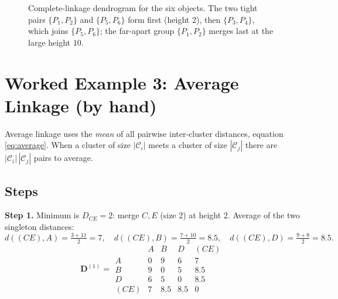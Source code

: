 \documentclass[11pt,a4paper]{report}
\theoremstyle{definition}
\theoremstyle{plain}
\theoremstyle{remark}
\newcommand{\C}{\mathcal{C}}
\newcommand{\merge}[5]{%
  \draw[thick] (#1,#2) -- (#1,#5) -- (#3,#5) -- (#3,#4);
}
\begin{document}
\begin{figure}[ht]
\centering
{}
\caption{Complete-linkage dendrogram for the six objects. The two tight pairs
$\{P_1,P_2\}$ and $\{P_5,P_6\}$ form first (height $2$), then $\{P_3,P_4\}$,
which joins $\{P_5,P_6\}$; the far-apart group $\{P_1,P_2\}$ merges last at the
large height $10$.}
\label{fig:compdend}
\end{figure}

\chapter{Worked Example 3: Average Linkage (by hand)}
\label{ch:average}

Average linkage uses the \emph{mean} of all pairwise inter-cluster distances,
equation \eqref{eq:average}. When a cluster of size $|\C_i|$ meets a cluster of
size $|\C_j|$ there are $|\C_i|\,|\C_j|$ pairs to average.

\section{Steps}
\textbf{Step 1.} Minimum is $D_{CE}=2$: merge $C,E$ (size 2) at height $2$.
Average of the two singleton distances:
\[
d((CE),A)=\tfrac{3+11}{2}=7,\quad
d((CE),B)=\tfrac{7+10}{2}=8.5,\quad
d((CE),D)=\tfrac{9+8}{2}=8.5.
\]
\begin{equation}
\mathbf{D}^{(1)}=
\begin{array}{c|cccc}
    & A & B & D & (CE)\\ \hline
A   & 0 & 9 & 6 & 7\\
B   & 9 & 0 & 5 & 8.5\\
D   & 6 & 5 & 0 & 8.5\\
(CE)& 7 &8.5&8.5& 0
\end{array}
\end{equation}
\end{document}
